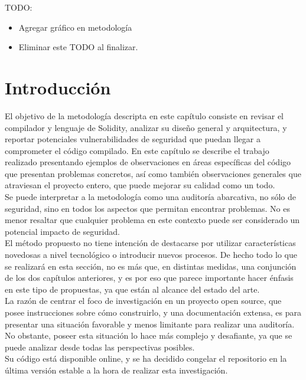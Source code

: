 TODO:
\begin{itemize}
    \item Agregar gráfico en metodología
    \item Eliminar este TODO al finalizar.
\end{itemize}
\bigskip

\section{Introducción}

El objetivo de la metodología descripta en este capítulo consiste en revisar el compilador y lenguaje de Solidity, analizar su diseño general y arquitectura, y reportar potenciales vulnerabilidades de seguridad que puedan llegar a comprometer el código compilado. En este capítulo se describe el trabajo realizado presentando ejemplos de observaciones en áreas específicas del código que presentan problemas concretos, así como también observaciones generales que atraviesan el proyecto entero, que puede mejorar su calidad como un todo.\\

Se puede interpretar a la metodología como una auditoría abarcativa, no sólo de seguridad, sino en todos los aspectos que permitan encontrar problemas. No es menor resaltar que cualquier problema en este contexto puede ser considerado un potencial impacto de seguridad.\\

El método propuesto no tiene intención de destacarse por utilizar características novedosas a nivel tecnológico o introducir nuevos procesos. De hecho todo lo que se realizará en esta sección, no es más que, en distintas medidas, una conjunción de los dos capítulos anteriores, y es por eso que parece importante hacer énfasis en este tipo de propuestas, ya que están al alcance del estado del arte.\\

La razón de centrar el foco de investigación en un proyecto open source, que posee instrucciones sobre cómo construirlo, y una documentación extensa, es para presentar una situación favorable y menos limitante para realizar una auditoría. No obstante, poseer esta situación lo hace más complejo y desafiante, ya que se puede analizar desde todas las perspectivas posibles.\\

Su código está disponible online, y se ha decidido congelar el repositorio en la última versión estable a la hora de realizar esta investigación.


